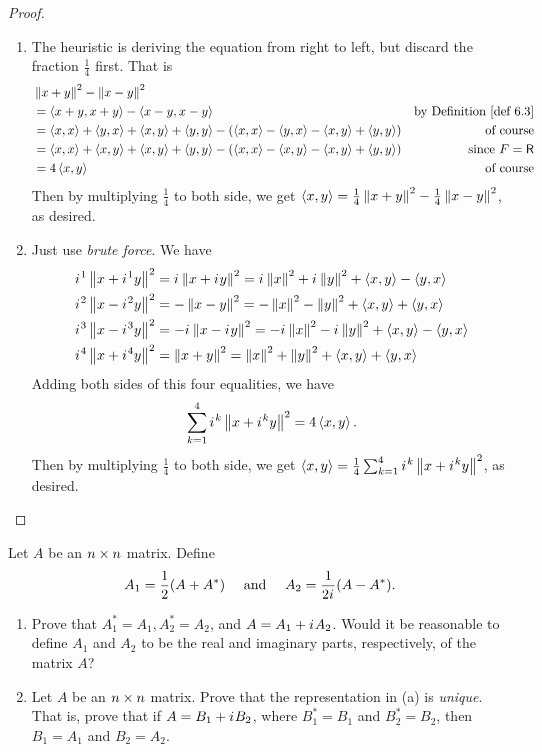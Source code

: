 \begin{proof} \ 

\begin{enumerate}
\item The heuristic is deriving the equation from right to left, but discard the fraction \(\frac{1}{4}\) first.
That is
\begin{align*}
    & \norm{x + y}^2 - \norm{x - y}^2 \\
    & = \LG x + y, x + y \RG - \LG x - y, x - y \RG & \text{by \DEF{6.3}} \\
    & = \LG x, x \RG + \LG y, x \RG + \LG x, y \RG + \LG y, y \RG - (\LG x, x \RG - \LG y, x \RG - \LG x, y \RG + \LG y, y \RG) & \text{of course} \\
    & = \LG x, x \RG + \LG x, y \RG + \LG x, y \RG + \LG y, y \RG - (\LG x, x \RG - \LG x, y \RG - \LG x, y \RG + \LG y, y \RG) & \text{since \(F = \SET{R}\)} \\
    & = 4 \LG x, y \RG & \text{of course}
\end{align*}
Then by multiplying \(\frac{1}{4}\) to both side, we get \(\left< x, y \right> = \frac{1}{4} \left\lVert x + y\right\rVert^2 - \frac{1}{4} \left\lVert x - y\right\rVert^2\), as desired.

\item Just use \emph{brute force}.
We have
\begin{align*}
    {i\mkern1mu}^1 \left\lVert x + {i\mkern1mu}^1 y\right\rVert^2
        & = {i\mkern1mu} \left\lVert x + {i\mkern1mu} y\right\rVert^2 = {i\mkern1mu} \left\lVert x\right\rVert^2 + {i\mkern1mu} \left\lVert y\right\rVert^2 + \left< x, y \right> - \left< y, x \right> \\
    {i\mkern1mu}^2 \left\lVert x - {i\mkern1mu}^2 y\right\rVert^2
        & = -\left\lVert x - y\right\rVert^2 = -\left\lVert x\right\rVert^2 - \left\lVert y\right\rVert^2 + \left< x, y \right> + \left< y, x \right> \\
    {i\mkern1mu}^3 \left\lVert x - {i\mkern1mu}^3 y\right\rVert^2
        & = -{i\mkern1mu}\left\lVert x - {i\mkern1mu} y\right\rVert^2 = -{i\mkern1mu}\left\lVert x\right\rVert^2 - {i\mkern1mu}\left\lVert y\right\rVert^2 + \left< x, y \right> - \left< y, x \right> \\
    {i\mkern1mu}^4 \left\lVert x + {i\mkern1mu}^4 y\right\rVert^2
        & = \left\lVert x + y\right\rVert^2 = \left\lVert x\right\rVert^2 + \left\lVert y\right\rVert^2 + \left< x, y \right> + \left< y, x \right>
\end{align*}
Adding both sides of this four equalities, we have
\[
    \sum_{k = 1}^4 {i\mkern1mu}^k \left\lVert x + {i\mkern1mu}^k y\right\rVert^2 = 4 \left< x, y \right>.
\]
Then by multiplying \(\frac{1}{4}\) to both side, we get \(\left< x, y \right> = \frac{1}{4} \sum_{k = 1}^4 {i\mkern1mu}^k \left\lVert x + {i\mkern1mu}^k y\right\rVert^2\), as desired.
\end{enumerate}
\end{proof}

\begin{exercise} \label{exercise 6.1.21}
Let \(A\) be an \(n \times n\) matrix.
Define
\[
    A_1 = \frac{1}{2} (A + A^*) \quad \text{ and } \quad A_2 = \frac{1}{2{i\mkern1mu}} (A - A^*).
\]
\begin{enumerate}
\item Prove that \(A_1^* = A_1, A_2^* = A_2\), and \(A = A_1 + {i\mkern1mu} A_2\).
Would it be reasonable to define \(A_1\) and \(A_2\) to be the real and imaginary parts, respectively, of the matrix \(A\)?
\item Let \(A\) be an \(n \times n\) matrix.
Prove that the representation in (a) is \emph{unique}.
That is, prove that if \(A = B_1 + {i\mkern1mu} B_2\), where \(B_1^* = B_1\) and \(B_2^* = B_2\), then \(B_1 = A_1\) and \(B_2 = A_2\).
\end{enumerate}
\end{exercise}


